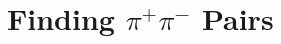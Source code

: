 \documentclass[abstract = on,listof=totoc, bibliography=totoc]{scrreprt}
\begin{document}




\section{Finding $\pi^+\pi^-$ Pairs}

\end{document}
